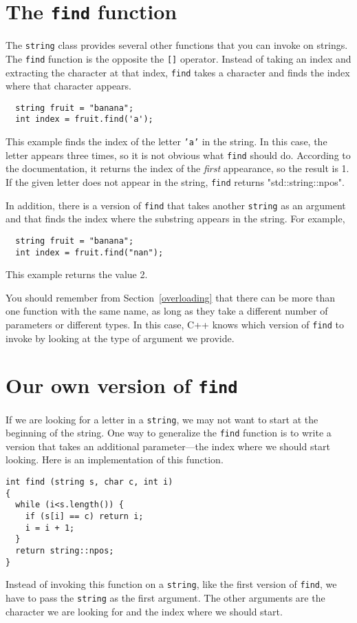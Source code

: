 \section{The {\tt find} function}

The {\tt string} class provides several other functions that you can
invoke on strings.  The {\tt find} function is the opposite the
{\tt []} operator.  Instead of taking an index and extracting the
character at that index, {\tt find} takes a character and finds the
index where that character appears.

\begin{verbatim}
  string fruit = "banana";
  int index = fruit.find('a');
\end{verbatim}
%
This example finds the index of the letter {\tt 'a'} in the string.
In this case, the letter appears three times, so it is not obvious
what {\tt find} should do.  According to the documentation, it returns
the index of the {\em first} appearance, so the result is 1.  If the
given letter does not appear in the string, {\tt find} returns "std::string::npos".

In addition, there is a
version of {\tt find} that takes another {\tt string} as
an argument and that finds the index where the substring
appears in the string.  For example,

\begin{verbatim}
  string fruit = "banana";
  int index = fruit.find("nan");
\end{verbatim}
%
This example returns the value 2.

You should remember from Section~\ref{overloading} that there
can be more than one function with the same name, as long as they
take a different number of parameters or different types.  In
this case, C++ knows which version of {\tt find} to invoke
by looking at the type of argument we provide.

\section{Our own version of {\tt find}}

If we are looking for a letter in a {\tt string}, we may
not want to start at the beginning of the string.  One way
to generalize the {\tt find} function is to write a version
that takes an additional parameter---the index where we should
start looking.  Here is an implementation of this function.

\begin{verbatim}
int find (string s, char c, int i)
{
  while (i<s.length()) {
    if (s[i] == c) return i;
    i = i + 1;
  }
  return string::npos;
}
\end{verbatim}
%
Instead of invoking this function on a {\tt string}, like
the first version of {\tt find}, we have to pass the {\tt string}
as the first argument.  The other arguments are the character
we are looking for and the index where we should start.

